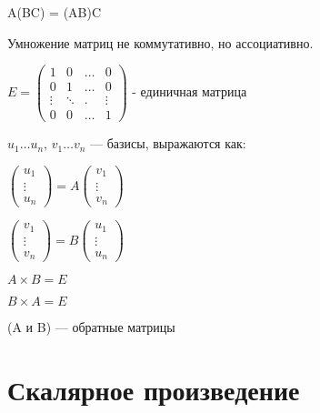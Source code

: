 \begin{theorem}
    
    A(BC) = (AB)C 

    Умножение матриц не коммутативно, но ассоциативно.

\end{theorem}


$E = \left(
        \begin{array}{cccc}
            1 & 0 & \ldots & 0\\
            0 & 1 & \ldots & 0\\
            \vdots & \ddots & . &\vdots\\
            0 & 0 & \ldots & 1
        \end{array}
        \right)$ - единичная матрица



        
\begin{remark}
    $u_1 \ldots u_n$, $v_1 \ldots v_n$ --- базисы, выражаются как:
    
    
    $\left(
        \begin{array}{c}
            u_1\\
            \vdots\\
            u_n
        \end{array}
        \right) = A \left(
            \begin{array}{c}
                v_1\\
                \vdots\\
                v_n
            \end{array}
            \right)$


$\left(
    \begin{array}{c}
        v_1\\
        \vdots\\
        v_n
    \end{array}
    \right) = B \left(
        \begin{array}{c}
            u_1\\
            \vdots\\
            u_n
        \end{array}
        \right)$

$A \times B = E$

$B \times A = E$

(A и B) --- обратные матрицы
\end{remark}



\section{Скалярное произведение}

